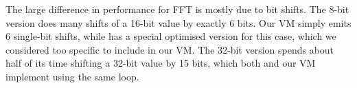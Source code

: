 The large difference in performance for FFT is mostly due to bit shifts. The 8-bit version does many shifts of a 16-bit value by exactly 6 bits. Our VM simply emits 6 single-bit shifts, while  has a special optimised version for this case, which we considered too specific to include in our VM. The 32-bit version spends about half of its time shifting a 32-bit value by 15 bits, which both  and our VM implement using the same loop.


%
%
%
%

